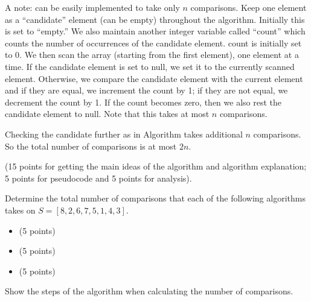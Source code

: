 \documentclass{article}
\begin{document}
\begin{solution}
    A note:  can  be easily implemented to take only $n$ comparisons. Keep
    one element as a ``candidate'' element  (can be empty) throughout the algorithm. Initially this is set  to ``empty.''
    We also maintain another integer variable called ``count'' which counts the number of occurrences
    of the candidate element.  count is initially set to 0. We then scan the  array (starting from the first element), one
    element at a time. If the candidate element is set to null, we set it to the currently scanned element.
    Otherwise, we compare the candidate element with the current element and if they are equal, we increment
    the count by 1; if they are not equal, we decrement the count by 1. If the count becomes zero, then
    we also rest the candidate element to null.  Note that this takes at most $n$ comparisons.

    Checking the candidate further as in  Algorithm  takes additional $n$ comparisons.
    So the total number of comparisons is at most $2n$.

    (15 points for getting the main ideas of the algorithm and algorithm explanation; 5 points for pseudocode
    and 5 points for analysis).


\end{solution}

\begin{exercise}{5.1}
    Determine the total number of comparisons that each of the following algorithms takes on $S = [8, 2, 6, 7, 5, 1, 4, 3]$.
    \begin{itemize}[nosep]
        \item {} (5 points)
        \item {} (5 points)
        \item {}  (5 points)
    \end{itemize}
    Show the steps of the algorithm when calculating the number of comparisons.
\end{exercise}
\end{document}
